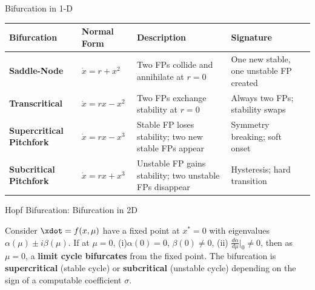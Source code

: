 \documentclass[aspectratio=169,xcolor=dvipsnames,svgnames,x11names,fleqn]{beamer}
\begin{document}
\begin{frame}{Bifurcation in 1-D}

    \resizebox{0.9\textwidth}{!}
{
\begin{tabular}{|p{4.0cm}|p{3.0cm}|p{3.0cm}|p{5.0cm}|p{4.0cm}|}
\hline
\textbf{Bifurcation} & \textbf{Normal Form} & \textbf{Description} & \textbf{Signature} \\
\hline
\textbf{Saddle-Node} & $\dot{x} = r + x^2$ & Two FPs collide and annihilate at $r=0$ & One new stable, one unstable FP created \\
\hline
\textbf{Transcritical} & $\dot{x} = rx - x^2$ & Two FPs exchange stability at $r=0$ & Always two FPs; stability swaps \\
\hline
\textbf{Supercritical Pitchfork} & $\dot{x} = rx - x^3$ & Stable FP loses stability; two new stable FPs appear & Symmetry breaking; soft onset \\
\hline
\textbf{Subcritical Pitchfork} & $\dot{x} = rx + x^3$ & Unstable FP gains stability; two unstable FPs disappear & Hysteresis; hard transition \\
\hline
\end{tabular}
}

    
\end{frame}


\begin{frame}{Hopf Bifurcation: Bifurcation in 2D}

        \begin{tcolorbox}[
    enhanced,
    rounded corners,
    boxrule=0.5pt, 
    bottomrule=2mm, 
    rightrule = 2mm,
    colframe=white!80!blue,
    colback=WarmWhite,
    notitle,
    left=1mm ]

    Consider $\xdot = f(x, \mu)$ have a fixed point at $x^* = 0$ with eigenvalues $\alpha(\mu ) \pm i \beta (\mu)$. If at $\mu = 0$, (i)$\alpha(0) = 0$, $\beta(0) \neq 0$, (ii) $\frac{d\alpha}{d\mu}|_0 \neq 0$, then as $\mu = 0$, a \textbf{limit cycle bifurcates} from the fixed point. The bifurcation is \textbf{supercritical} (stable cycle) or \textbf{subcritical} (unstable cycle) depending on the sign of a computable coefficient $\sigma$.

        \end{tcolorbox}

    
\end{frame}
\end{document}
